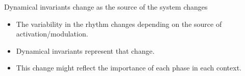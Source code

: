 \documentclass[aspectratio=43]{beamer}
\begin{document}
%

\begin{frame}{Dynamical invariants change as the source of the system changes}
	\begin{itemize}
		\item The variability in the rhythm changes depending on the source of activation/modulation. 
		\item Dynamical invariants represent that change. 
		\item This change might reflect the importance of each phase in each context. 
	\end{itemize}
\end{frame}
\end{document}
